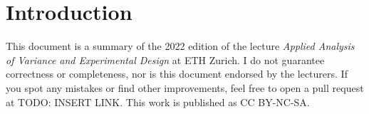 \section{Introduction}

This document is a summary of the 2022 edition of the lecture \textit{Applied Analysis of Variance and Experimental Design} at ETH Zurich. I do not guarantee correctness or completeness, nor is this document endorsed by the lecturers. If you spot any mistakes or find other improvements, feel free to open a pull request at TODO: INSERT LINK. This work is published as CC BY-NC-SA.
\begin{center}
	\ccbyncsa
\end{center}
